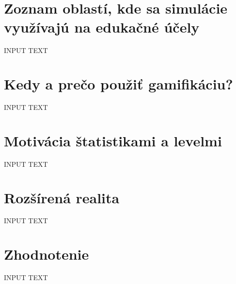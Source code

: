 \documentclass[10pt,slovak,a4paper]{article}
\begin{document}
\section{Zoznam oblastí, kde sa simulácie využívajú na edukačné účely} \label{List}

INPUT TEXT

\section{Kedy a prečo použiť gamifikáciu?} \label{Reason}

INPUT TEXT

\section{Motivácia štatistikami a levelmi} \label{Motivation}

INPUT TEXT

\section{Rozšírená realita} \label{Augmented_reality}

INPUT TEXT

\section{Zhodnotenie} \label{Evaluation}

INPUT TEXT

%
%
\end{document}
